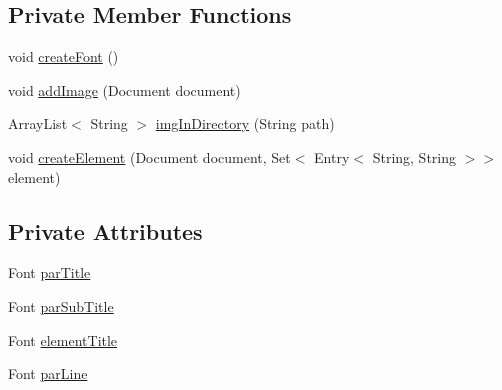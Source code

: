 \subsection*{Private Member Functions}
\begin{DoxyCompactItemize}
\item 
void \hyperlink{classit_1_1isislab_1_1masonhelperdocumentation_1_1mason_1_1control_1_1_p_d_f_generator_a403097faddc3554447db07d62b3ebfda}{create\-Font} ()
\item 
void \hyperlink{classit_1_1isislab_1_1masonhelperdocumentation_1_1mason_1_1control_1_1_p_d_f_generator_abc1f7c0af1e9a3328d917e6e1751d421}{add\-Image} (Document document)
\item 
Array\-List$<$ String $>$ \hyperlink{classit_1_1isislab_1_1masonhelperdocumentation_1_1mason_1_1control_1_1_p_d_f_generator_a9fa1dfe581da4d09e9c7bee1a8b12972}{img\-In\-Directory} (String path)
\item 
void \hyperlink{classit_1_1isislab_1_1masonhelperdocumentation_1_1mason_1_1control_1_1_p_d_f_generator_ac98a9ab63c62a942fc1d410aab226e36}{create\-Element} (Document document, Set$<$ Entry$<$ String, String $>$$>$ element)
\end{DoxyCompactItemize}
\subsection*{Private Attributes}
\begin{DoxyCompactItemize}
\item 
Font \hyperlink{classit_1_1isislab_1_1masonhelperdocumentation_1_1mason_1_1control_1_1_p_d_f_generator_a74f4e5e2095668aa762c3c3df4325c74}{par\-Title}
\item 
Font \hyperlink{classit_1_1isislab_1_1masonhelperdocumentation_1_1mason_1_1control_1_1_p_d_f_generator_ac4f2d6c81c14b60dcddfc358b9296ee5}{par\-Sub\-Title}
\item 
Font \hyperlink{classit_1_1isislab_1_1masonhelperdocumentation_1_1mason_1_1control_1_1_p_d_f_generator_aef4e775d865ce931436933184abfcafa}{element\-Title}
\item 
Font \hyperlink{classit_1_1isislab_1_1masonhelperdocumentation_1_1mason_1_1control_1_1_p_d_f_generator_a4887bc031c4ee6469cf807e7cd1afca6}{par\-Line}
\end{DoxyCompactItemize}

